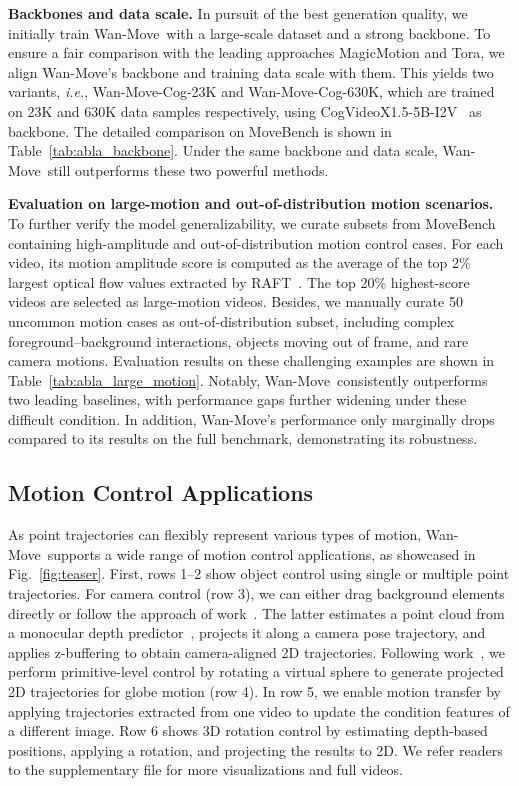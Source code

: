 \documentclass{article}
\newcommand{\method}{Wan-Move}
\newcommand{\ie}{\textit{i.e.}}
\begin{document}
\noindent
\textbf{Backbones and data scale.}
In pursuit of the best generation quality, we initially train \method~with a large-scale dataset and a strong backbone.
To ensure a fair comparison with the leading approaches MagicMotion and Tora, we align \method's backbone and training data scale with them. This yields two variants, \ie, \method-Cog-23K and \method-Cog-630K, which are trained on 23K and 630K data samples respectively, using CogVideoX1.5-5B-I2V~\cite{cogvideox} as backbone.
The detailed comparison on MoveBench is shown in Table~\ref{tab:abla_backbone}. Under the same backbone and data scale, \method~still outperforms these two powerful methods.

\noindent
\textbf{Evaluation on large-motion and out-of-distribution motion scenarios.}
To further verify the model generalizability, we curate subsets from MoveBench containing high-amplitude and out-of-distribution motion control cases.
For each video, its motion amplitude score is computed as the average of the top 2\% largest optical flow values extracted by RAFT~\cite{teed2020raft}. The top 20\% highest-score videos are selected as large-motion videos. Besides, we manually curate 50 uncommon motion cases as out-of-distribution subset, including complex foreground–background interactions, objects moving out of frame, and rare camera motions.
Evaluation results on these challenging examples are shown in Table~\ref{tab:abla_large_motion}.
Notably, \method~consistently outperforms two leading baselines, with performance gaps further widening under these difficult condition. In addition, \method’s performance only marginally drops compared to its results on the full benchmark, demonstrating its robustness. 

\subsection{Motion Control Applications}
\label{subsec:application}
\vspace{-0.5em}
As point trajectories can flexibly represent various types of motion, \method~supports a wide range of motion control applications, as showcased in Fig.~\ref{fig:teaser}.
First, rows 1–2 show object control using single or multiple point trajectories.
For camera control (row 3), we can either drag background elements directly or follow the approach of work~\cite{geng2024motion}. The latter estimates a point cloud from a monocular depth predictor~\cite{yang2024depth}, projects it along a camera pose trajectory, and applies z-buffering to obtain camera-aligned 2D trajectories.
Following work~\cite{geng2024motion}, we perform primitive-level control by rotating a virtual sphere to generate projected 2D trajectories for globe motion (row 4).
In row 5, we enable motion transfer by applying trajectories extracted from one video to update the condition features of a different image.
Row 6 shows 3D rotation control by estimating depth-based positions, applying a rotation, and projecting the results to 2D.
We refer readers to the supplementary file for more visualizations and full videos.
\end{document}
